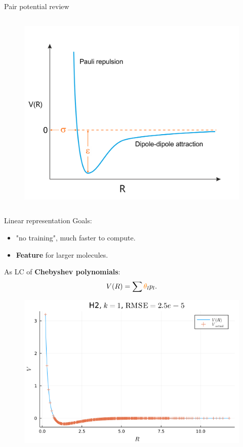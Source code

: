 \documentclass{beamer}
\begin{document}
\begin{frame}{Pair potential review}
\begin{columns}
\begin{column}{0.5\textwidth}
\begin{figure}[htbp]
                \includegraphics[scale=0.18]{img/slide/lennard_jones_potential_edit.png}
                \label{fig:ozone}
            \end{figure}
        \end{column}
    \end{columns}
\end{frame}

\begin{frame}{Linear representation}
    Goals: 
    \begin{itemize}
        \item "no training", much faster to compute.
        \item \textbf{Feature} for larger molecules.
    \end{itemize}
    As LC of \textbf{Chebyshev polynomials}:
    \begin{equation}
        V(R) = \sum {\color{orange}\theta}_l p_l.
    \end{equation}
    \begin{figure}[H]
        \centering
            \includegraphics[scale=0.3]{img/linear_RATPOT/linratpot_linsolve_H2_example3.png}
        \label{fig:linratpot_linsolve_H2}
    \end{figure}
\end{frame}
\end{document}
